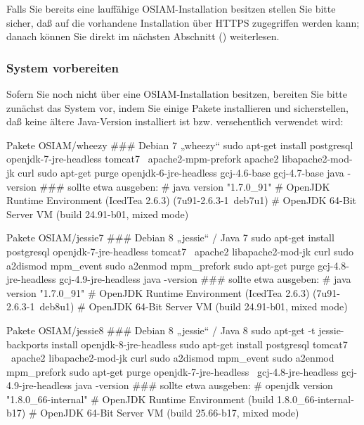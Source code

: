 Falls Sie bereits eine lauffähige OSIAM-Installation besitzen stellen
Sie bitte sicher, daß auf die vorhandene Installation über HTTPS
zugegriffen werden kann; danach können Sie direkt im nächsten Abschnitt
() weiterlesen.

\subsubsection{System vorbereiten}\label{subsubsec:setup-osiam-prepare}

\begin{minipage}{\textwidth}
Sofern Sie noch nicht über eine OSIAM-Installation besitzen, bereiten
Sie bitte zunächst das System vor, indem Sie einige Pakete installieren
und sicherstellen, daß keine ältere Java-Version installiert ist bzw.
versehentlich verwendet wird:

\begin{lstdump}{Pakete OSIAM/wheezy}
### Debian 7 „wheezy“
sudo apt-get install postgresql openjdk-7-jre-headless tomcat7 \
    apache2-mpm-prefork apache2 libapache2-mod-jk curl
sudo apt-get purge openjdk-6-jre-headless gcj-4.6-base gcj-4.7-base
java -version
### sollte etwa ausgeben:
# java version "1.7.0_91"
# OpenJDK Runtime Environment (IcedTea 2.6.3) (7u91-2.6.3-1~deb7u1)
# OpenJDK 64-Bit Server VM (build 24.91-b01, mixed mode)
\end{lstdump}

\begin{lstdump}{Pakete OSIAM/jessie7}
### Debian 8 „jessie“ / Java 7
sudo apt-get install postgresql openjdk-7-jre-headless tomcat7 \
    apache2 libapache2-mod-jk curl
sudo a2dismod mpm_event
sudo a2enmod mpm_prefork
sudo apt-get purge gcj-4.8-jre-headless gcj-4.9-jre-headless
java -version
### sollte etwa ausgeben:
# java version "1.7.0_91"
# OpenJDK Runtime Environment (IcedTea 2.6.3) (7u91-2.6.3-1~deb8u1)
# OpenJDK 64-Bit Server VM (build 24.91-b01, mixed mode)
\end{lstdump}

\begin{lstdump}{Pakete OSIAM/jessie8}
### Debian 8 „jessie“ / Java 8
sudo apt-get -t jessie-backports install openjdk-8-jre-headless
sudo apt-get install postgresql tomcat7 \
    apache2 libapache2-mod-jk curl
sudo a2dismod mpm_event
sudo a2enmod mpm_prefork
sudo apt-get purge openjdk-7-jre-headless \
    gcj-4.8-jre-headless gcj-4.9-jre-headless
java -version
### sollte etwa ausgeben:
# openjdk version "1.8.0_66-internal"
# OpenJDK Runtime Environment (build 1.8.0_66-internal-b17)
# OpenJDK 64-Bit Server VM (build 25.66-b17, mixed mode)
\end{lstdump}
\end{minipage}

